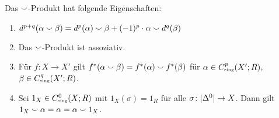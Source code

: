 \begin{lemma}[{name=[Eigenschaften des Cup-Produktes]},label=lem:eig_cup]
	Das $\smallsmile$-Produkt hat folgende Eigenschaften:
	\begin{enumerate}[1)]
		\item $d^{p+q}(\alpha \smallsmile \beta) = d^p(\alpha) \smallsmile \beta + (-1)^p \cdot \alpha \smallsmile d^q(\beta)$
		\item Das $\smallsmile$-Produkt ist assoziativ.
		\item Für $f \colon X \to X'$ gilt $f^*(\alpha \smallsmile \beta)= f^*(\alpha) \smallsmile f^*(\beta)$ für $\alpha \in C^p_\sing(X';R)$, $\beta \in C^q_\sing(X';R)$.
		\item Sei $1_X \in C_\sing^0(X;R)$ mit $1_X(\sigma)=1_R$ für alle $\sigma \colon \lvert\Delta^0\rvert \to X$. Dann gilt $1_X \smallsmile \alpha = \alpha = \alpha\smallsmile 1_X$.
	\end{enumerate}
\end{lemma}
